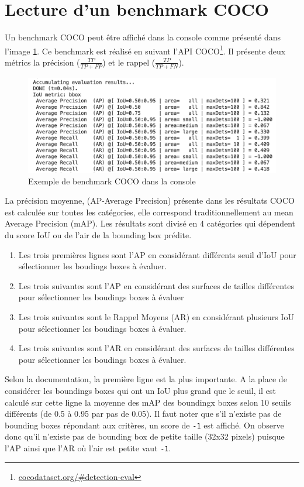 \section{Lecture d'un benchmark COCO}
Un benchmark COCO peut être affiché dans la console comme présenté dans l'image \ref{fig:eval_coco_benchmark}. Ce benchmark est réalisé en suivant l'API COCO\footnote[1]{\url{cocodataset.org/\#detection-eval}}. Il présente deux métrics la précision ($\displaystyle{\frac{TP}{TP+FP} }$) et le rappel ($\displaystyle{ \frac{TP}{TP+FN}}$).
\begin{figure}[h!]
    \centering
    \includegraphics[width=\textwidth]{images/eval_coco_benchmark_white.png}
    \caption{Exemple de benchmark COCO dans la console}
    \label{fig:eval_coco_benchmark}
\end{figure}
La précision moyenne, (AP-Average Precision) présente dans les résultats COCO est calculée sur toutes les catégories, elle correspond traditionnellement au mean Average Precision (mAP).
Les résultats sont divisé en 4 catégories qui dépendent du score IoU ou de l'air de la bounding box prédite.
\begin{enumerate}
    \item Les trois premières lignes sont l'AP en considérant différents seuil d'IoU pour sélectionner les boudings boxes à évaluer.
    \item Les trois suivantes sont l'AP en considérant des surfaces de tailles différentes pour sélectionner les boudings boxes à évaluer
    \item Les trois suivantes sont le Rappel Moyens (AR) en considérant plusieurs IoU pour sélectionner les boudings boxes à évaluer.
    \item Les trois suivantes sont l'AR en considérant des surfaces de tailles différentes pour sélectionner les boudings boxes à évaluer.
\end{enumerate}
Selon la documentation, la première ligne est la plus importante. A la place de considérer les boundings boxes qui ont un IoU plus grand que le seuil, il est calculé sur cette ligne la moyenne des mAP des boundingx boxes selon 10 seuils différents (de 0.5 à 0.95 par pas de 0.05).
Il faut noter que s'il n'existe pas de bounding boxes répondant aux critères, un score de \verb|-1| est affiché. On observe donc qu'il n'existe pas de bounding box de petite taille (32x32 pixels) puisque l'AP ainsi que l'AR où l'air est petite vaut \verb|-1|.
